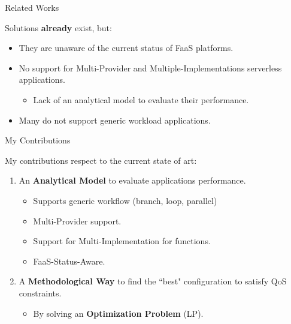 \documentclass[13.5pt]{beamer}
\newcommand{\B}[1]{\textcolor{TorVergataColor}{\textbf{#1}}}
\begin{document}
\begin{frame}{Related Works}

Solutions \B{already} exist, but:
\vspace{\baselineskip}
\begin{itemize}
	\item They are unaware of the current status of FaaS platforms.
	\vspace{\baselineskip}
	\item No support for Multi-Provider and Multiple-Implementations serverless applications. 
		\begin{itemize}
			\item Lack of an analytical model to evaluate their  performance.
		\end{itemize}
	\vspace{\baselineskip}
	\item Many do not support generic workload applications.
\end{itemize}

\end{frame} 


\begin{frame}{My Contributions}
	
	My contributions respect to the current state of art:
	\vspace{\baselineskip}
	\begin{enumerate}
	
		\item An \B{Analytical Model} to evaluate applications performance.
		\begin{itemize}
			\item Supports generic workflow (branch, loop, parallel)
			\item Multi-Provider support.
			\item Support for Multi-Implementation for functions.
			\item FaaS-Status-Aware.
		\end{itemize}
		\vspace{\baselineskip} 
		\item A \B{Methodological Way} to find the ``best" configuration to satisfy QoS constraints.
		\begin{itemize}
			\item By solving an \B{Optimization Problem} (LP).
		\end{itemize}
		\vspace{\baselineskip} 
		
	\end{enumerate}
	
\end{frame} 
\end{document}
